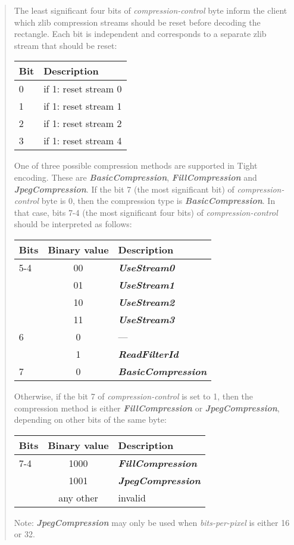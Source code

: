 \documentclass[a4paper]{article}
\newcommand{\typestr}[1]{\textit{#1}}
\newcommand{\literal}[1]{\textit{\textbf{#1}}}
\begin{document}
\begin{quote}
The least significant four bits of \typestr{compression-control} byte
inform the client which zlib compression streams should be reset
before decoding the rectangle. Each bit is independent and corresponds
to a separate zlib stream that should be reset:

\begin{tabular}{l|l}
\hline
Bit & Description    \\
\hline
0   & if 1: reset stream 0 \\
1   & if 1: reset stream 1 \\
2   & if 1: reset stream 2 \\
3   & if 1: reset stream 4 \\
\hline
\end{tabular}

One of three possible compression methods are supported in Tight
encoding. These are \literal{BasicCompression},
\literal{FillCompression} and \literal{JpegCompression}. If the bit 7 (the
most significant bit) of \typestr{compression-control} byte is 0, then
the compression type is \literal{BasicCompression}. In that case, bits
7-4 (the most significant four bits) of \typestr{compression-control}
should be interpreted as follows:

\begin{tabular}{l|c|l}
\hline
Bits & Binary value & Description \\
\hline
5-4 & 00  & \literal{UseStream0} \\
    & 01  & \literal{UseStream1} \\
    & 10  & \literal{UseStream2} \\
    & 11  & \literal{UseStream3} \\
\hline
6   & 0   & --- \\
    & 1   & \literal{ReadFilterId} \\
\hline
7   & 0   & \literal{BasicCompression} \\
\hline
\end{tabular}

Otherwise, if the bit 7 of \typestr{compression-control} is set to 1,
then the compression method is either \literal{FillCompression} or
\literal{JpegCompression}, depending on other bits of the same byte:

\begin{tabular}{l|c|l}
\hline
Bits & Binary value & Description \\
\hline
7-4 & 1000 & \literal{FillCompression} \\
    & 1001 & \literal{JpegCompression} \\
    & any other & invalid \\
\hline
\end{tabular}

Note: \literal{JpegCompression} may only be used when
\typestr{bits-per-pixel} is either 16 or 32.

\end{quote}
\end{document}
